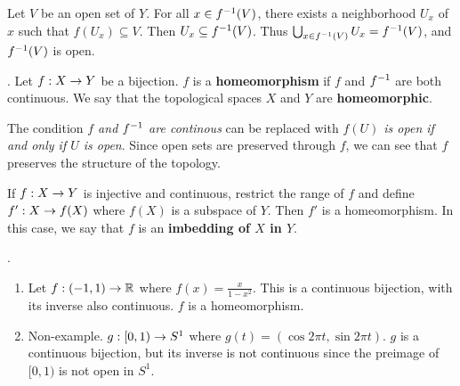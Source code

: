  Let \(V\) be an open set of \(Y\). For all \(x \in f^{-1}(V)\), there exists a neighborhood \(U_x\) of \(x\) such that \(f(U_x) \subseteq V\). Then \(U_x \subseteq f^{-1}(V)\). Thus \(\bigcup_{x \in f^{-1}(V)} U_x = f^{-1}(V)\), and \(f^{-1}(V)\) is open.

.  Let \(f: X \rightarrow Y\) be a bijection. \(f\) is a \textbf{homeomorphism} if \(f\) and \(f^{-1}\) are both continuous. We say that the topological spaces \(X\) and \(Y\) are \textbf{homeomorphic}.

\rmk The condition \textit{\(f\) and \(f^{-1}\) are continous} can be replaced with \textit{\(f(U)\) is open if and only if \(U\) is open}. Since open sets are preserved through \(f\), we can see that \(f\) preserves the structure of the topology.

\rmk If \(f : X \rightarrow Y\) is injective and continuous, restrict the range of \(f\) and define \(f': X \rightarrow f(X)\) where \(f(X)\) is a subspace of \(Y\). Then \(f'\) is a homeomorphism. In this case, we say that \(f\) is an \textbf{imbedding of \(X\) in \(Y\)}.

\ex.
\begin{enumerate}
    \item Let \(f: (-1, 1) \rightarrow \mathbb{R}\) where \(f(x) = \frac{x}{1-x^2}\). This is a continuous bijection, with its inverse also continuous. \(f\) is a homeomorphism.
    \item Non-example. \(g : [0, 1) \rightarrow S^1\) where \(g(t) = (\cos 2\pi t, \sin 2\pi t)\). \(g\) is a continuous bijection, but its inverse is not continuous since the preimage of \([0, 1)\) is not open in \(S^1\).
\end{enumerate}


\pagebreak
